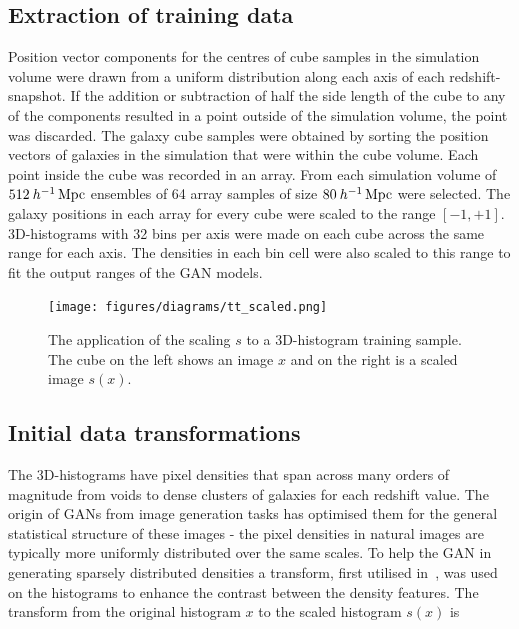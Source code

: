 \documentclass[twocolumn]{article}
\numberwithin{equation}{section}
\begin{document}

\subsection{Extraction of training data} %
Position vector components for the centres of cube samples in the simulation volume were drawn from a uniform distribution 
along each axis of each redshift-snapshot. If the addition or subtraction of half the side length of the cube to any of 
the components resulted in a point outside of the simulation volume, the point was discarded. The galaxy cube samples were 
obtained by sorting the position vectors of galaxies in the simulation that were within the cube volume. Each point inside 
the cube was recorded in an array. From each simulation volume of $512 \: h^{-1} \,\textup{Mpc}$ ensembles of 64 array 
samples of size $80 \: h^{-1} \,\textup{Mpc}$ were selected. The galaxy positions in each array for every cube were scaled
to the range $[-1,+1]$. 3D-histograms with 32 bins per axis were made on each cube across the same range for each axis. 
The densities in each bin cell were also scaled to this range to fit the output ranges of the GAN models. 

\begin{figure}
\texttt{[image: figures/diagrams/tt\_scaled.png]}%
\centering
\caption{The application of the scaling $s$ to a 3D-histogram training sample. The cube on the left shows an 
image $x$ and on the right is a scaled image $s(x)$.}
\label{fig:scaling}
\end{figure}

\subsection{Initial data transformations} 
The 3D-histograms have pixel densities that span across many orders of magnitude from voids to dense clusters of galaxies 
for each redshift value. The origin of GANs from image generation tasks has optimised them for the general statistical 
structure of these images - the pixel densities in natural images are typically more uniformly distributed over the same 
scales. To help the GAN in generating sparsely distributed densities a transform, first utilised in~\cite{web_gan}, was 
used on the histograms to enhance the contrast between the density features. The transform from the original histogram 
$x$ to the scaled histogram $s(x)$ is 
\end{document}
